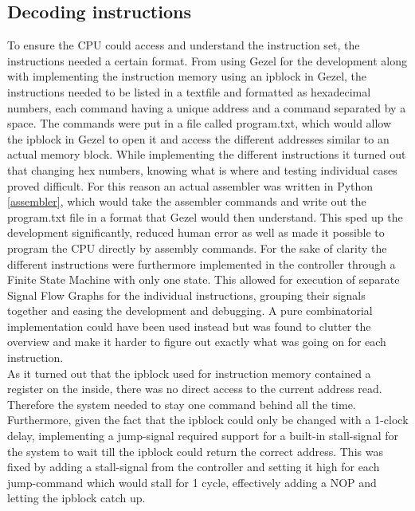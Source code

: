 \documentclass[12pt,a4paper]{article}
\begin{document}
\subsection{Decoding instructions}
	To ensure the CPU could access and understand the instruction set, the instructions needed a certain format. From using Gezel for the development along with implementing the instruction memory using an ipblock in Gezel, the instructions needed to be listed in a textfile and formatted as hexadecimal numbers, each command having a unique address and a command separated by a space. The commands were put in a file called program.txt, which would allow the ipblock in Gezel to open it and access the different addresses similar to an actual memory block.
	While implementing the different instructions it turned out that changing hex numbers, knowing what is where and testing individual cases proved difficult. For this reason an actual assembler was written in Python \ref{assembler}, which would take the assembler commands and write out the program.txt file in a format that Gezel would then understand. This sped up the development significantly, reduced human error as well as made it possible to program the CPU directly by assembly commands.
		For the sake of clarity the different instructions were furthermore implemented in the controller through a Finite State Machine with only one state. This allowed for execution of separate Signal Flow Graphs for the individual instructions, grouping their signals together and easing the development and debugging. A pure combinatorial implementation could have been used instead but was found to clutter the overview and make it harder to figure out exactly what was going on for each instruction.\\
	As it turned out that the ipblock used for instruction memory contained a register on the inside, there was no direct access to the current address read. Therefore the system needed to stay one command behind all the time. 
	Furthermore, given the fact that the ipblock could only be changed with a 1-clock delay, implementing a jump-signal required support for a built-in stall-signal for the system to wait till the ipblock could return the correct address. This was fixed by adding a stall-signal from the controller and setting it high for each jump-command which would stall for 1 cycle, effectively adding a NOP and letting the ipblock catch up.
	
\end{document}
